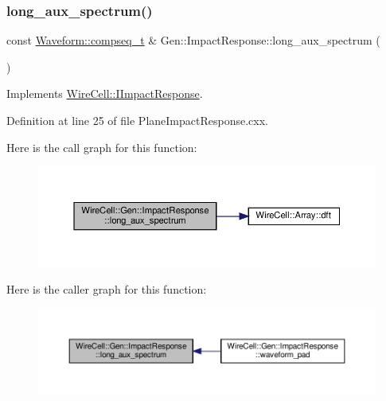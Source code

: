 \subsubsection{\texorpdfstring{long\+\_\+aux\+\_\+spectrum()}{long\_aux\_spectrum()}}
{\footnotesize\ttfamily const \hyperlink{namespace_wire_cell_1_1_waveform_a7e4a8d371f774438bb360e7d1dcb583a}{Waveform\+::compseq\+\_\+t} \& Gen\+::\+Impact\+Response\+::long\+\_\+aux\+\_\+spectrum (\begin{DoxyParamCaption}{ }\end{DoxyParamCaption})\hspace{0.3cm}{\ttfamily [virtual]}}



Implements \hyperlink{class_wire_cell_1_1_i_impact_response_a9f7ad74ee3cbc5b5cb5138d4bfaf29b5}{Wire\+Cell\+::\+I\+Impact\+Response}.



Definition at line 25 of file Plane\+Impact\+Response.\+cxx.

Here is the call graph for this function\+:
\nopagebreak
\begin{figure}[H]
\begin{center}
\leavevmode
\includegraphics[width=350pt]{class_wire_cell_1_1_gen_1_1_impact_response_a8d8bd238c6286a8e6c70dc7a543a5ca3_cgraph}
\end{center}
\end{figure}
Here is the caller graph for this function\+:
\nopagebreak
\begin{figure}[H]
\begin{center}
\leavevmode
\includegraphics[width=350pt]{class_wire_cell_1_1_gen_1_1_impact_response_a8d8bd238c6286a8e6c70dc7a543a5ca3_icgraph}
\end{center}
\end{figure}
\mbox{\label{class_wire_cell_1_1_gen_1_1_impact_response_ad722252b3658fea7cfc38d1d1dee3787}} 
